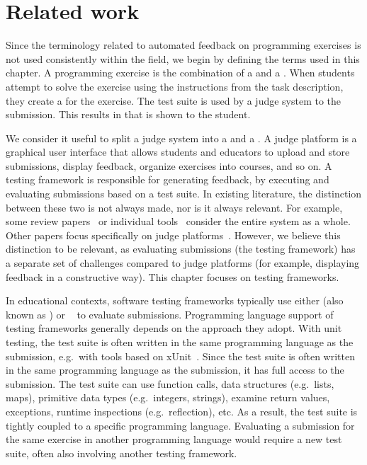 \documentclass[../main]{subfiles}
\begin{document}
\section{Related work}\label{sec:tested1-related-work}

Since the terminology related to automated feedback on programming exercises is not used consistently within the field,
we begin by defining the terms used in this chapter.
A programming exercise is the combination of a  and a .
When students attempt to solve the exercise using the instructions from the task description, they create a  for the exercise.
The test suite is used by a judge system to  the submission.
This results in  that is shown to the student.

We consider it useful to split a judge system into a  and a .
A judge platform is a graphical user interface that allows students and educators to upload and store submissions, display feedback, organize exercises into courses, and so on.
A testing framework is responsible for generating feedback, by executing and evaluating submissions based on a test suite.
In existing literature, the distinction between these two is not always made, nor is it always relevant.
For example, some review papers~\autocite{keuningSystematicLiteratureReview2018,wasikSurveyOnlineJudge2018} or individual tools~\autocite{bezURIOnlineJudge2014,petitJutgeOrgCharacteristics2018} consider the entire system as a whole.
Other papers focus specifically on judge platforms~\autocite{gusukumaPedalInfrastructureAutomated2020,strieweArchitectureModularGrading2016}.
However, we believe this distinction to be relevant, as evaluating submissions (the testing framework) has a separate set of challenges compared to judge platforms (for example, displaying feedback in a constructive way).
This chapter focuses on testing frameworks.

In educational contexts, software testing frameworks typically use either  (also known as ) or ~\autocite{paivaAutomatedAssessmentComputer2022} to evaluate submissions.
Programming language support of testing frameworks generally depends on the approach they adopt.
With unit testing, the test suite is often written in the same programming language as the submission, e.g.\ with tools based on xUnit~\autocite{meszarosXUnitTestPatterns2007}.
Since the test suite is often written in the same programming language as the submission, it has full access to the submission.
The test suite can use function calls, data structures (e.g.\ lists, maps), primitive data types (e.g.\ integers, strings), examine return values, exceptions, runtime inspections (e.g.\ reflection), etc.
As a result, the test suite is tightly coupled to a specific programming language.
Evaluating a submission for the same exercise in another programming language would require a new test suite, often also involving another testing framework.
\end{document}
